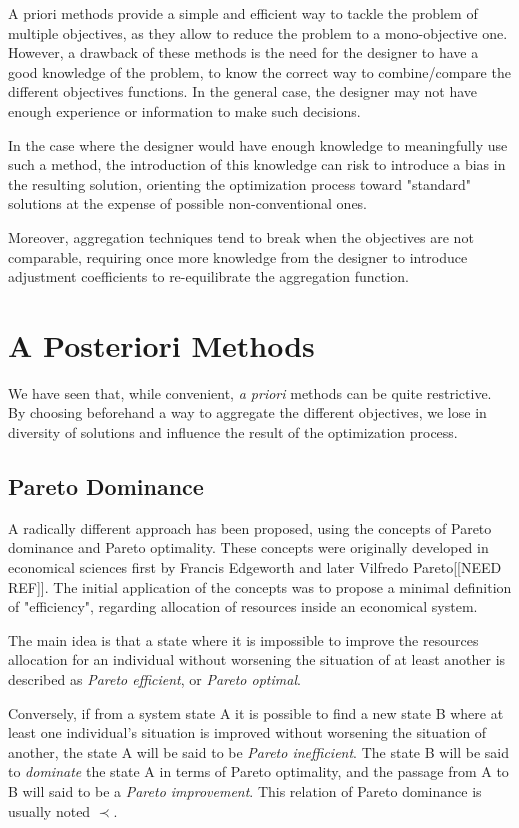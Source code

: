 A priori methods provide a simple and efficient way to tackle the problem of multiple objectives, as they allow to reduce the problem to a mono-objective one.
However, a drawback of these methods is the need for the designer to have a good knowledge of the problem, to know the correct way to combine/compare the different objectives functions. In the general case, the designer may not have enough experience or information to make such decisions.

In the case where the designer would have enough knowledge to meaningfully use such a method, the introduction of this knowledge can risk to introduce a bias in the resulting solution, orienting the optimization process toward "standard" solutions at the expense of possible non-conventional ones.

Moreover, aggregation techniques tend to break when the objectives are not comparable, requiring once more knowledge from the designer to introduce adjustment coefficients to re-equilibrate the aggregation function.

\section{A Posteriori Methods}

We have seen that, while convenient, \emph{a priori} methods can be quite restrictive. By choosing beforehand a way to aggregate the different objectives, we lose in diversity of solutions and influence the result of the optimization process.

\subsection{Pareto Dominance}

A radically different approach has been proposed, using the concepts of Pareto dominance and Pareto optimality. These concepts were originally developed in economical sciences first by Francis Edgeworth and later Vilfredo Pareto[[NEED REF]]. The initial application of the concepts was to propose a minimal definition of "efficiency", regarding allocation of resources inside an economical system.

The main idea is that a state where it is impossible to improve the resources allocation for an individual without worsening the situation of at least another is described as \emph{Pareto efficient}, or \emph{Pareto optimal}.

Conversely, if from a system state A it is possible to find a new state B where at least one individual's situation is improved without worsening the situation of another, the state A will be said to be \emph{Pareto inefficient}. The state B will be said to \emph{dominate} the state A in terms of Pareto optimality, and the passage from A to B will said to be a \emph{Pareto improvement}. This relation of Pareto dominance is usually noted \(\prec\).

